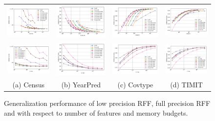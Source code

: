 \begin{figure}
	\centering
	\begin{tabular}{c c c c}
		\includegraphics[width=0.24\linewidth]{figures/census_L2_loss_vs_n_memory.pdf} &
		\includegraphics[width=0.24\linewidth]{figures/yearpred_L2_loss_vs_n_memory.pdf} &
		\includegraphics[width=0.24\linewidth]{figures/covtype_accuracy_vs_n_memory.pdf} &
		\includegraphics[width=0.24\linewidth]{figures/timit_accuracy_vs_n_memory.pdf} \\
		\includegraphics[width=0.24\linewidth]{figures/census_L2_loss_vs_n_feat.pdf} &
		\includegraphics[width=0.24\linewidth]{figures/yearpred_L2_loss_vs_n_feat.pdf} &
		\includegraphics[width=0.24\linewidth]{figures/covtype_accuracy_vs_n_feat.pdf} &
		\includegraphics[width=0.24\linewidth]{figures/timit_accuracy_vs_n_feat.pdf} \\
		(a) Census & (b) YearPred & (c) Covtype & (d) TIMIT \\
	\end{tabular}
	\caption{Generalization performance of low precision RFF, full precision RFF and \Nystrom with respect to number of features and memory budgets.}
	\label{fig:generalizatio_col}
\end{figure}

